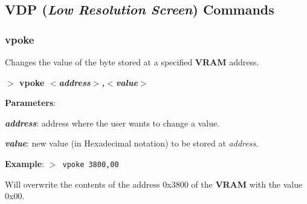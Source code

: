         



        

    \subsection{VDP (\textit{Low Resolution Screen}) Commands}\label{vdpcmds}
        \subsubsection{{vpoke}}
        \label{cmd:vpoke}

        Changes the value of the byte stored at a specified \textbf{VRAM}
        address.

        \hspace{1.9cm}\textbf{$>$ vpoke \textit{$<$address$>$,$<$value$>$}}

        \textbf{Parameters}:

        \hspace{1cm}\textbf{\textit{address}}: address where the user wants
        to change a value.
        
        \hspace{1cm}\textbf{\textit{value}}: new value (in Hexadecimal notation)
        to be stored at \textit{address}.

        \textbf{Example}: \texttt{$>$ vpoke 3800,00}

        Will overwrite the contents of the address 0x3800 of the \textbf{VRAM}
        with the value 0x00.

